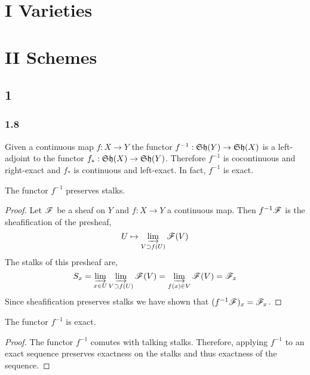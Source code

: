\documentclass[12pt]{article}
\begin{document}
\tableofcontents

\newpage

\section{I Varieties}

\section{II Schemes}

\subsection{1}

\subsubsection{1.8}

Given a continuous map $f : X \to Y$ the functor $f^{-1} : \mathfrak{Sh}(Y) \to \mathfrak{Sh}(X)$ is a left-adjoint to the functor $f_* : \mathfrak{Sh}(X) \to \mathfrak{Sh}(Y)$. Therefore $f^{-1}$ is cocontinuous and right-exact and $f_*$ is continuous and left-exact. In fact, $f^{-1}$ is exact. 

\begin{lemma}
The functor $f^{-1}$ preserves stalks.
\end{lemma}

\begin{proof}
Let $\mathscr{F}$ be a sheaf on $Y$ and $f : X \to Y$ a continuous map. Then $f^{-1} \mathscr{F}$ is the sheafification of the presheaf,
\[ U \mapsto \varinjlim_{V \supset f(U)} \mathscr{F}(V) \]
The stalks of this presheaf are,
\[ S_x = \varinjlim_{x \in U} \varinjlim_{V \supset f(U)} \mathscr{F}(V) = \varinjlim_{f(x) \in V} \mathscr{F}(V) = \mathscr{F}_x \]
Since sheafification preserves stalks we have shown that $(f^{-1} \mathscr{F})_x = \mathscr{F}_x$.
\end{proof}

\begin{proposition}
The functor $f^{-1}$ is exact. 
\end{proposition}

\begin{proof}
The functor $f^{-1}$ comutes with talking stalks. Therefore, applying $f^{-1}$ to an exact sequence preserves exactness on the stalks and thus exactness of the sequence.
\end{proof}
\end{document}
